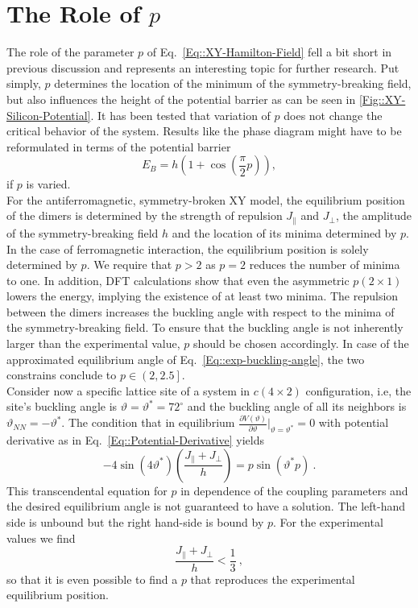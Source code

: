 	\section{The Role of $p$} \label{Section::role-p}
	The role of the parameter $p$ of Eq.~\eqref{Eq::XY-Hamilton-Field} fell a bit short in previous discussion and represents an interesting topic for further research. Put simply, $p$ determines the location of the minimum of the symmetry-breaking field, but also influences the height of the potential barrier as can be seen in \autoref{Fig::XY-Silicon-Potential}. It has been tested that variation of $p$ does not change the critical behavior of the system. Results like the phase diagram  might have to be reformulated in terms of the potential barrier	
	\begin{equation}
		E_B =	h \left(1 + \cos\left(\frac{\pi}{2} p \right)\right),
	\end{equation}
	if $p$ is varied. \\
	
	For the antiferromagnetic, symmetry-broken XY model, the equilibrium position of the dimers is determined by the strength of repulsion $J_\parallel$ and $J_\perp$, the amplitude of the symmetry-breaking field $h$ and the location of its minima determined by $p$. In the case of ferromagnetic interaction, the equilibrium position is solely determined by $p$. We require that $p > 2$ as $p=2$ reduces the number of minima to one. In addition, DFT calculations show that even the asymmetric $p(2 \times 1)$ lowers the energy, implying the existence of at least two minima. The repulsion between the dimers increases the buckling angle with respect to the minima of the symmetry-breaking field. To ensure that the buckling angle is not inherently larger than the experimental value, $p$ should be chosen accordingly. In case of the approximated equilibrium angle of Eq.~\eqref{Eq::exp-buckling-angle}, the two constrains conclude to $p \in \left(2, 2.5\right]$. \\
	
	Consider now a specific lattice site of a system in $c(4\times2)$ configuration, i.e, the site's buckling angle is $\vartheta =	\vartheta^* =	72^\circ$ and the buckling angle of all its neighbors is $\vartheta_{NN} =	- \vartheta^*$. The condition that in equilibrium $\tfrac{\partial V(\vartheta)}{\partial \vartheta} \Big |_{\vartheta =	\vartheta^*} =	0$ with potential derivative as in Eq.~\eqref{Eq::Potential-Derivative} yields
	\begin{equation} \label{Eq::Equilibrium-Position}
		-4 \sin(4 \vartheta^*) \left(\frac{J_\parallel + J_\perp}{h}\right) =	p \sin \left(\vartheta^* p\right)~.
	\end{equation}
	This transcendental equation for $p$ in dependence of the coupling parameters and the desired equilibrium angle is not guaranteed to have a solution. 	The left-hand side is unbound but the right hand-side is bound by $p$. For the experimental values we find
	\begin{equation}
		\frac{J_\parallel + J_\perp}{h} < \frac{1}{3}~,
	\end{equation}
	so that it is even possible to find a $p$ that reproduces the experimental equilibrium position.

